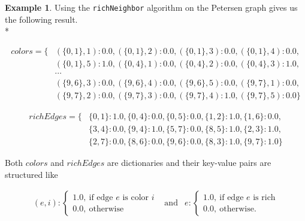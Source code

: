 \documentclass[12pt,a4paper]{amsart}
\theoremstyle{definition} %
\newtheorem{primer}[definicija]{Example}
\theoremstyle{plain} %
\begin{document}
            \begin{primer}
                Using the \texttt{richNeighbor} algorithm on the Petersen graph gives us the following result.\\*

                \begin{align*}
                    colors = \{ & (\{0, 1\}, 1): 0.0, (\{0, 1\}, 2): 0.0, (\{0, 1\}, 3): 0.0, (\{0, 1\}, 4): 0.0,\\
                                & (\{0, 1\}, 5): 1.0, (\{0, 4\}, 1): 0.0, (\{0, 4\}, 2): 0.0, (\{0, 4\}, 3): 1.0,\\
                                & \cdots \\
                                & (\{9, 6\}, 3): 0.0, (\{9, 6\}, 4): 0.0, (\{9, 6\}, 5): 0.0, (\{9, 7\}, 1): 0.0,\\
                                & (\{9, 7\}, 2): 0.0, (\{9, 7\}, 3): 0.0, (\{9, 7\}, 4): 1.0, (\{9, 7\}, 5): 0.0\}
                \end{align*}

                \begin{align*}
                    richEdges = \{& \{0, 1\}: 1.0, \{0, 4\}: 0.0, \{0, 5\}: 0.0, \{1, 2\}: 1.0, \{1, 6\}: 0.0,\\
                                  & \{3, 4\}: 0.0, \{9, 4\}: 1.0, \{5, 7\}: 0.0, \{8, 5\}: 1.0, \{2, 3\}: 1.0,\\
                                  & \{2, 7\}: 0.0, \{8, 6\}: 0.0, \{9, 6\}: 0.0, \{8, 3\}: 1.0, \{9, 7\}: 1.0\}
                \end{align*}

                Both $colors$ and $richEdges$ are dictionaries and their key-value pairs are structured like

                \begin{align*}
                    (e, i):
                    \begin{cases}
                        1.0, \  \text{if edge $e$ is color $i$} \\
                        0.0, \  \text{otherwise}
                    \end{cases} & \text{and} & 
                    e:
                    \begin{cases}
                        1.0, \  \text{if edge $e$ is rich} \\
                        0.0, \  \text{otherwise.}
                    \end{cases}
                \end{align*}

            \end{primer}    
\end{document}
